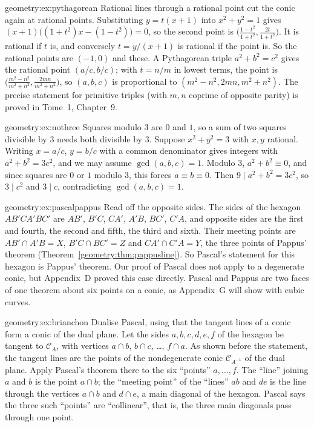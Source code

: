 \begin{solution}{geometry:ex:pythagorean}
\idea Rational lines through a rational point cut the conic again at rational points.
\writeup Substituting $y=t(x+1)$ into $x^2+y^2=1$ gives $(x+1)\bigl((1+t^2)x-(1-t^2)\bigr)=0$, so the second point is
$\bigl(\frac{1-t^2}{1+t^2},\frac{2t}{1+t^2}\bigr)$. It is rational if $t$ is, and conversely $t=y/(x+1)$ is rational if the point is. So the rational points
are $(-1,0)$ and these. A Pythagorean triple $a^2+b^2=c^2$ gives the rational point $(a/c,b/c)$; with $t=n/m$ in lowest terms, the point is
$\bigl(\frac{m^2-n^2}{m^2+n^2},\frac{2mn}{m^2+n^2}\bigr)$, so $(a,b,c)$ is proportional to $(m^2-n^2,2mn,m^2+n^2)$. The precise statement for primitive
triples (with $m,n$ coprime of opposite parity) is proved in Tome~1, Chapter~9.
\end{solution}

\begin{solution}{geometry:ex:nothree}
\idea Squares modulo $3$ are $0$ and $1$, so a sum of two squares divisible by $3$ needs both divisible by $3$.
\writeup Suppose $x^2+y^2=3$ with $x,y$ rational. Writing $x=a/c$, $y=b/c$ with a common denominator gives integers with $a^2+b^2=3c^2$, and we may assume
$\gcd(a,b,c)=1$. Modulo $3$, $a^2+b^2\equiv0$, and since squares are $0$ or $1$ modulo $3$, this forces $a\equiv b\equiv0$. Then $9\mid a^2+b^2=3c^2$,
so $3\mid c^2$ and $3\mid c$, contradicting $\gcd(a,b,c)=1$.
\end{solution}

\begin{solution}{geometry:ex:pascalpappus}
\idea Read off the opposite sides.
\writeup The sides of the hexagon $AB'CA'BC'$ are $AB'$, $B'C$, $CA'$, $A'B$, $BC'$, $C'A$, and opposite sides are the first and fourth, the second and fifth,
the third and sixth. Their meeting points are $AB'\cap A'B=X$, $B'C\cap BC'=Z$ and $CA'\cap C'A=Y$, the three points of Pappus' theorem (Theorem~\ref{geometry:thm:pappusline}).
So Pascal's statement for this hexagon is Pappus' theorem. Our proof of Pascal does not apply to a degenerate conic, but Appendix~D proved this case
directly. Pascal and Pappus are two faces of one theorem about six points on a conic, as Appendix~G will show with cubic curves.
\end{solution}

\begin{solution}{geometry:ex:brianchon}
\idea Dualise Pascal, using that the tangent lines of a conic form a conic of the dual plane.
\writeup Let the sides $a,b,c,d,e,f$ of the hexagon be tangent to $\mathcal C_A$, with vertices $a\cap b$, $b\cap c$, \dots, $f\cap a$. As shown before the
statement, the tangent lines are the points of the nondegenerate conic $\mathcal C_{A^{-1}}$ of the dual plane. Apply Pascal's theorem there to the
six ``points'' $a,\dots,f$. The ``line'' joining $a$ and $b$ is the point $a\cap b$; the ``meeting point'' of the ``lines'' $ab$ and $de$ is the line
through the vertices $a\cap b$ and $d\cap e$, a main diagonal of the hexagon. Pascal says the three such ``points'' are ``collinear'', that is, the
three main diagonals pass through one point.
\end{solution}


